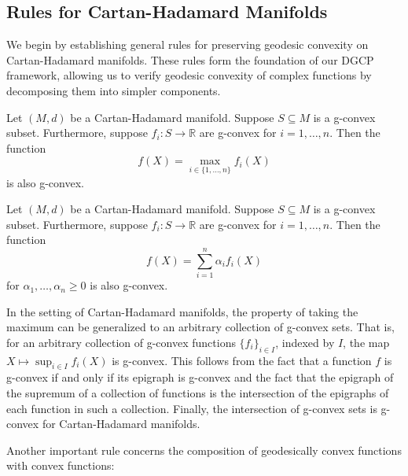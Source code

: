 \subsection{Rules for Cartan-Hadamard Manifolds}

We begin by establishing general rules for preserving geodesic convexity on Cartan-Hadamard manifolds. These rules form the foundation of our DGCP framework, allowing us to verify geodesic convexity of complex functions by decomposing them into simpler components.

\begin{proposition}
Let $(M, d)$ be a Cartan-Hadamard manifold. Suppose $S \subseteq M$ is a g-convex subset. Furthermore, suppose $f_i: S \rightarrow \mathbb{R}$ are g-convex for $i = 1, \ldots, n$. Then the function
\begin{equation}
f(X) = \max_{i \in \{1, \ldots, n\}} f_i(X)
\end{equation}
is also g-convex.
\end{proposition}

\begin{proposition}
Let $(M, d)$ be a Cartan-Hadamard manifold. Suppose $S \subseteq M$ is a g-convex subset. Furthermore, suppose $f_i: S \rightarrow \mathbb{R}$ are g-convex for $i = 1, \ldots, n$. Then the function
\begin{equation}
f(X) = \sum_{i=1}^n \alpha_i f_i(X)
\end{equation}
for $\alpha_1, \ldots, \alpha_n \geq 0$ is also g-convex.
\end{proposition}

\begin{remark}
In the setting of Cartan-Hadamard manifolds, the property of taking the maximum can be generalized to an arbitrary collection of g-convex sets. That is, for an arbitrary collection of g-convex functions $\{f_i\}_{i \in I}$, indexed by $I$, the map $X \mapsto \sup_{i \in I} f_i(X)$ is g-convex. This follows from the fact that a function $f$ is g-convex if and only if its epigraph is g-convex and the fact that the epigraph of the supremum of a collection of functions is the intersection of the epigraphs of each function in such a collection. Finally, the intersection of g-convex sets is g-convex for Cartan-Hadamard manifolds.
\end{remark}

Another important rule concerns the composition of geodesically convex functions with convex functions:

